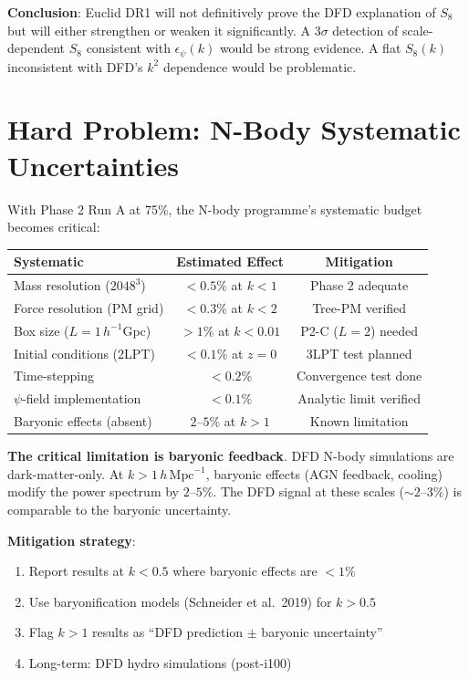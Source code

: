\documentclass[11pt,a4paper]{article}
\begin{document}
\textbf{Conclusion}: Euclid DR1 will not definitively prove the DFD explanation of $S_8$ but will either strengthen or weaken it significantly. A $3\sigma$ detection of scale-dependent $S_8$ consistent with $\epsilon_\psi(k)$ would be strong evidence. A flat $S_8(k)$ inconsistent with DFD's $k^2$ dependence would be problematic.

\section{Hard Problem: N-Body Systematic Uncertainties}

With Phase 2 Run A at 75\%, the N-body programme's systematic budget becomes critical:

\begin{center}
\begin{tabular}{lcc}
\toprule
\textbf{Systematic} & \textbf{Estimated Effect} & \textbf{Mitigation} \\
\midrule
Mass resolution ($2048^3$) & $< 0.5\%$ at $k < 1$ & Phase 2 adequate \\
Force resolution (PM grid) & $< 0.3\%$ at $k < 2$ & Tree-PM verified \\
Box size ($L = 1\,h^{-1}$Gpc) & $> 1\%$ at $k < 0.01$ & P2-C ($L = 2$) needed \\
Initial conditions (2LPT) & $< 0.1\%$ at $z = 0$ & 3LPT test planned \\
Time-stepping & $< 0.2\%$ & Convergence test done \\
$\psi$-field implementation & $< 0.1\%$ & Analytic limit verified \\
Baryonic effects (absent) & $2$--$5\%$ at $k > 1$ & Known limitation \\
\bottomrule
\end{tabular}
\end{center}

\textbf{The critical limitation is baryonic feedback}. DFD N-body simulations are dark-matter-only. At $k > 1\,h\,\text{Mpc}^{-1}$, baryonic effects (AGN feedback, cooling) modify the power spectrum by $2$--$5\%$. The DFD signal at these scales ($\sim 2$--$3\%$) is comparable to the baryonic uncertainty.

\textbf{Mitigation strategy}:
\begin{enumerate}[nosep]
\item Report results at $k < 0.5$ where baryonic effects are $< 1\%$
\item Use baryonification models (Schneider et al.\ 2019) for $k > 0.5$
\item Flag $k > 1$ results as ``DFD prediction $\pm$ baryonic uncertainty''
\item Long-term: DFD hydro simulations (post-i100)
\end{enumerate}
\end{document}
